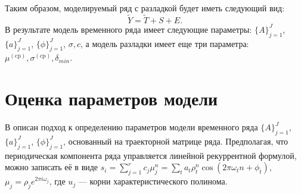 \documentclass[%
12pt,
master,  %
natbib,      %
subf,        %
substylefile = spbu.rtx,
href,        %
colorlinks,  %
]{disser}
\begin{document}
%
Таким образом, моделируемый ряд с разладкой будет иметь следующий вид:
\begin{equation*}
\tilde{Y} = \tilde{T} + S + E. 
\end{equation*}
В результате модель временного ряда имеет следующие параметры: $ \{A\}_{j=1}^J$, $ \{a\}_{j=1}^J$, $ \{\phi\}_{j=1}^J$, $\sigma, c $, а модель разладки имеет еще три параметра: $ \mu^{\mathrm{(cp)}}, \sigma^{\mathrm{(cp)}}, \delta_{min} $.


\section{Оценка параметров модели}\label{section:parameters_estimation}

В  \cite{Golyandina2018}  описан подход к определению параметров модели временного ряда $ \{A\}_{j=1}^J$,  $\{a\}_{j=1}^J$,  $\{\phi\}_{j=1}^J$, основанный на траекторной матрице ряда. Предполагая, что периодическая компонента ряда управляется линейной рекуррентной формулой, можно записать её в виде $s_i = \sum_{j=1}^r c_j \mu_j^n = \sum_ta_t\rho_t^n \cos(2\pi \omega_t n + \phi_t)$, $\mu_j = \rho_j e^{2\pi i \omega_j}$, где $u_j$ --- корни характеристического полинома. 

\end{document}
